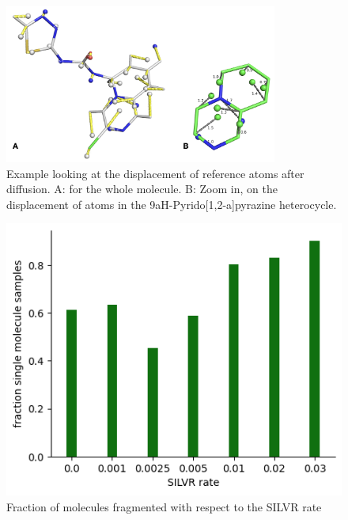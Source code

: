 \documentclass[journal=jacsat,manuscript=article]{achemso}
\begin{document}
\begin{suppinfo}
\begin{figure}
    \centering
    \includegraphics[width=0.8\textwidth]{paper/Figures/FigS3/FigS3.png}
    \caption{Example looking at the displacement of reference atoms after diffusion. A: for the whole molecule. B: Zoom in, on the displacement of atoms in the 9aH-Pyrido[1,2-a]pyrazine heterocycle. }
    \label{fig:atom_displacement}
\end{figure}

\begin{figure}
    \centering
    \includegraphics[widht=0.5\textwidth]{paper/Figures/FigS4/FigS4.png}
    \caption{Fraction of molecules fragmented with respect to the SILVR rate}
    \label{fig:my_label}
\end{figure}


\newapge



\end{suppinfo}
\end{document}
